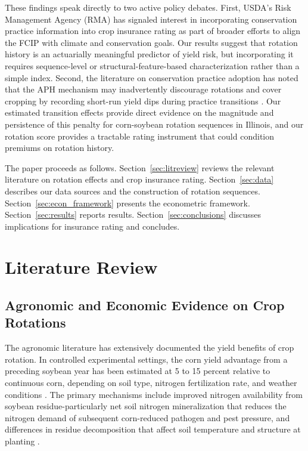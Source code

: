 \documentclass[12pt,letterpaper]{article}
\theoremstyle{remark}
\theoremstyle{remark}
\theoremstyle{plain}
\theoremstyle{definition}
\begin{document}
These findings speak directly to two active policy debates. First, USDA's Risk Management Agency (RMA) has signaled interest in incorporating conservation practice information into crop insurance rating as part of broader efforts to align the FCIP with climate and conservation goals. Our results suggest that rotation history is an actuarially meaningful predictor of yield risk, but incorporating it requires sequence-level or structural-feature-based characterization rather than a simple index. Second, the literature on conservation practice adoption has noted that the APH mechanism may inadvertently discourage rotations and cover cropping by recording short-run yield dips during practice transitions \citep{Connor2022}. Our estimated transition effects provide direct evidence on the magnitude and persistence of this penalty for corn-soybean rotation sequences in Illinois, and our rotation score provides a tractable rating instrument that could condition premiums on rotation history.
 
The paper proceeds as follows. Section~\ref{sec:litreview} reviews the relevant literature on rotation effects and crop insurance rating. Section~\ref{sec:data} describes our data sources and the construction of rotation sequences. Section~\ref{sec:econ_framework} presents the econometric framework. Section~\ref{sec:results} reports results. Section~\ref{sec:conclusions} discusses implications for insurance rating and concludes.

\section{\label{sec:litreview}Literature Review}
\subsection{\label{subsec:agronomy}Agronomic and Economic Evidence on Crop Rotations}

The agronomic literature has extensively documented the yield benefits of crop rotation. In controlled experimental settings, the corn yield advantage from a preceding soybean year has been estimated at 5 to 15 percent relative to continuous
corn, depending on soil type, nitrogen fertilization rate, and weather conditions \citep{Gentry2013, Farmaha2016}. The primary mechanisms include improved nitrogen availability from soybean residue-particularly net soil nitrogen mineralization that reduces the nitrogen demand of subsequent corn-reduced pathogen and pest pressure, and differences in residue decomposition that affect soil temperature and structure at planting \citep{Gentry2013}.
 
\end{document}
